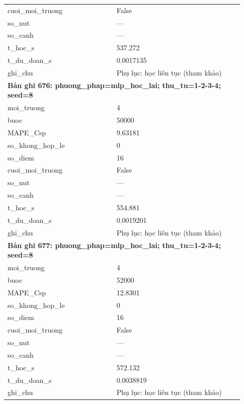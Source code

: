 \begin{longtable}{p{0.43\linewidth}p{0.50\linewidth}}
cuoi\_\allowbreak moi\_\allowbreak truong & False \\
so\_\allowbreak nut & — \\
so\_\allowbreak canh & — \\
t\_\allowbreak hoc\_\allowbreak s & 537.272 \\
t\_\allowbreak du\_\allowbreak doan\_\allowbreak s & 0.0017135 \\
ghi\_\allowbreak chu & Phụ lục: học liên tục (tham khảo) \\
\midrule
\multicolumn{2}{p{0.95\linewidth}}{\textbf{Bản ghi 676: phuong\_phap=mlp\_hoc\_lai; thu\_tu=1-2-3-4; seed=8}} \\
moi\_\allowbreak truong & 4 \\
buoc & 50000 \\
MAPE\_\allowbreak Csp & 9.63181 \\
so\_\allowbreak khong\_\allowbreak hop\_\allowbreak le & 0 \\
so\_\allowbreak diem & 16 \\
cuoi\_\allowbreak moi\_\allowbreak truong & False \\
so\_\allowbreak nut & — \\
so\_\allowbreak canh & — \\
t\_\allowbreak hoc\_\allowbreak s & 554.881 \\
t\_\allowbreak du\_\allowbreak doan\_\allowbreak s & 0.0019201 \\
ghi\_\allowbreak chu & Phụ lục: học liên tục (tham khảo) \\
\midrule
\multicolumn{2}{p{0.95\linewidth}}{\textbf{Bản ghi 677: phuong\_phap=mlp\_hoc\_lai; thu\_tu=1-2-3-4; seed=8}} \\
moi\_\allowbreak truong & 4 \\
buoc & 52000 \\
MAPE\_\allowbreak Csp & 12.8301 \\
so\_\allowbreak khong\_\allowbreak hop\_\allowbreak le & 0 \\
so\_\allowbreak diem & 16 \\
cuoi\_\allowbreak moi\_\allowbreak truong & False \\
so\_\allowbreak nut & — \\
so\_\allowbreak canh & — \\
t\_\allowbreak hoc\_\allowbreak s & 572.132 \\
t\_\allowbreak du\_\allowbreak doan\_\allowbreak s & 0.0038819 \\
ghi\_\allowbreak chu & Phụ lục: học liên tục (tham khảo) \\

\end{longtable}
